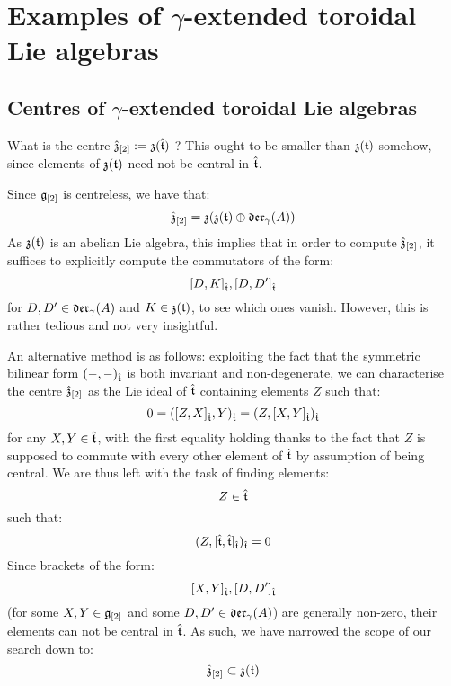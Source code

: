 \section{Examples of \texorpdfstring{$\gamma$}{}-extended toroidal Lie algebras}
    \subsection{Centres of \texorpdfstring{$\gamma$}{}-extended toroidal Lie algebras}
        \begin{question}
            What is the centre $\hat{\mathfrak{z}}_{[2]} := \mathfrak{z}( \hat{\mathfrak{t}} )$ ? This ought to be smaller than $\mathfrak{z}(\mathfrak{t})$ somehow, since elements of $\mathfrak{z}(\mathfrak{t})$ need not be central in $\hat{\mathfrak{t}}$. 
        \end{question}
        \begin{remark}
            Since $\mathfrak{g}_{[2]}$ is centreless, we have that:
                $$\hat{\mathfrak{z}}_{[2]} = \mathfrak{z}( \mathfrak{z}(\mathfrak{t}) \oplus \mathfrak{der}_{\gamma}(A) )$$
            As $\mathfrak{z}(\mathfrak{t})$ is an abelian Lie algebra, this implies that in order to compute $\hat{\mathfrak{z}}_{[2]}$, it suffices to explicitly compute the commutators of the form:
                $$[D, K]_{\hat{\mathfrak{t}}}, [D, D']_{\hat{\mathfrak{t}}}$$
            for $D, D' \in \mathfrak{der}_{\gamma}(A)$ and $K \in \mathfrak{z}(\mathfrak{t})$, to see which ones vanish. However, this is rather tedious and not very insightful.
            
            An alternative method is as follows: exploiting the fact that the symmetric bilinear form $(-, -)_{\hat{\mathfrak{t}}}$ is both invariant and non-degenerate, we can characterise the centre $\hat{\mathfrak{z}}_{[2]}$ as the Lie ideal of $\hat{\mathfrak{t}}$ containing elements $Z$ such that:
                $$0 = ([Z, X]_{\hat{\mathfrak{t}}}, Y)_{\hat{\mathfrak{t}}} = (Z, [X, Y]_{\hat{\mathfrak{t}}})_{\hat{\mathfrak{t}}}$$
            for any $X, Y \in \hat{\mathfrak{t}}$, with the first equality holding thanks to the fact that $Z$ is supposed to commute with every other element of $\hat{\mathfrak{t}}$ by assumption of being central. We are thus left with the task of finding elements:
                $$Z \in \hat{\mathfrak{t}}$$
            such that:
                $$(Z, [\hat{\mathfrak{t}}, \hat{\mathfrak{t}}]_{\hat{\mathfrak{t}}})_{\hat{\mathfrak{t}}} = 0$$
            Since brackets of the form:
                $$[X, Y]_{\hat{\mathfrak{t}}}, [D, D']_{\hat{\mathfrak{t}}}$$
            (for some $X, Y \in \mathfrak{g}_{[2]}$ and some $D, D' \in \mathfrak{der}_{\gamma}(A)$) are generally non-zero, their elements can not be central in $\hat{\mathfrak{t}}$. As such, we have narrowed the scope of our search down to:
                $$\hat{\mathfrak{z}}_{[2]} \subset \mathfrak{z}(\mathfrak{t})$$


\end{remark}
